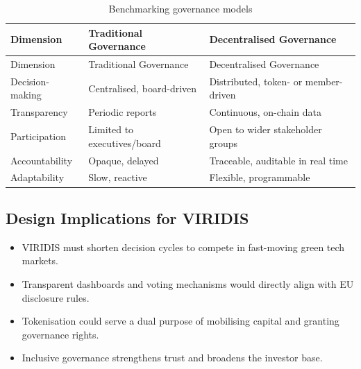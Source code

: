 \documentclass[
  english,
  12pt,
  oneside,
  open=any]{scrbook}
\providecommand{\tightlist}{%
  \setlength{\itemsep}{0pt}\setlength{\parskip}{0pt}}\usepackage{longtable,booktabs,array}
\begin{document}
\begin{longtable}[]{@{}
  >{\raggedright\arraybackslash}p{}
  >{\raggedright\arraybackslash}p{}
  >{\raggedright\arraybackslash}p{}@{}}
\caption{Benchmarking governance
models}\label{tbl-benchmark}\tabularnewline
\toprule\noalign{}
\begin{minipage}[b]{\linewidth}\raggedright
Dimension
\end{minipage} & \begin{minipage}[b]{\linewidth}\raggedright
Traditional Governance
\end{minipage} & \begin{minipage}[b]{\linewidth}\raggedright
Decentralised Governance
\end{minipage} \\
\midrule\noalign{}
\endfirsthead
\toprule\noalign{}
\begin{minipage}[b]{\linewidth}\raggedright
Dimension
\end{minipage} & \begin{minipage}[b]{\linewidth}\raggedright
Traditional Governance
\end{minipage} & \begin{minipage}[b]{\linewidth}\raggedright
Decentralised Governance
\end{minipage} \\
\midrule\noalign{}
\endhead
\bottomrule\noalign{}
\endlastfoot
Decision-making & Centralised, board-driven & Distributed, token- or
member-driven \\
Transparency & Periodic reports & Continuous, on-chain data \\
Participation & Limited to executives/board & Open to wider stakeholder
groups \\
Accountability & Opaque, delayed & Traceable, auditable in real time \\
Adaptability & Slow, reactive & Flexible, programmable \\
\end{longtable}

\subsection{Design Implications for VIRIDIS}\label{sec-implications}

\begin{itemize}
\tightlist
\item
  VIRIDIS must shorten decision cycles to compete in fast-moving green
  tech markets.\\
\item
  Transparent dashboards and voting mechanisms would directly align with
  EU disclosure rules.\\
\item
  Tokenisation could serve a dual purpose of mobilising capital and
  granting governance rights.\\
\item
  Inclusive governance strengthens trust and broadens the investor base.
\end{itemize}
\end{document}
